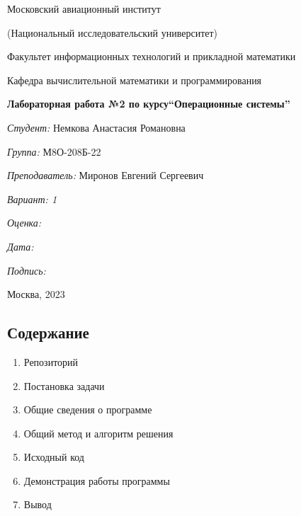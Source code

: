 \documentclass[a4paper, 14pt]{article}
\begin{document}
\thispagestyle{empty}	
\begin{center}
	Московский авиационный институт
	
	(Национальный исследовательский университет)
	
	Факультет информационных технологий и прикладной математики
	
	Кафедра вычислительной математики и программирования
	
\end{center}
\vspace{40ex}
\begin{center}
	\textbf{\large{Лабораторная работа №2 по курсу\linebreak \textquotedblleft Операционные системы\textquotedblright}}
\end{center}
\vspace{35ex}
\begin{flushright}
	\textit{Студент: } Немкова Анастасия Романовна
	
	\vspace{2ex}
	\textit{Группа: } М8О-208Б-22
	
	\vspace{2ex}
	\textit{Преподаватель: } Миронов Евгений Сергеевич
	
	\vspace{2ex}
	\textit{Вариант: 1} 
	
	\vspace{2ex}
	\textit{Оценка: } \underline{\quad\quad\quad\quad\quad\quad}
	
	 \vspace{2ex}
	\textit{Дата: } \underline{\quad\quad\quad\quad\quad\quad}
	
	\vspace{2ex}
	\textit{Подпись: } \underline{\quad\quad\quad\quad\quad\quad}
	
\end{flushright}

\vspace{5ex}

\begin{vfill}
	\begin{center}
		Москва, 2023
	\end{center}	
\end{vfill}
\newpage

\begin{center}
\section*{Содержание}   
\end{center}
\vspace{5ex}
\begin{enumerate}
  \item Репозиторий
  \item Постановка задачи
  \item Общие сведения о программе
  \item Общий метод и алгоритм решения
  \item Исходный код
  \item Демонстрация работы программы
  \item Вывод
\end{enumerate}
\newpage
\end{document}
